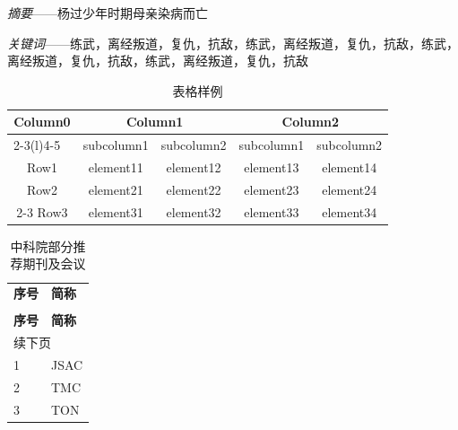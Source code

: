 

	\textit{摘要}——杨过少年时期母亲染病而亡

	\textit{关键词}——练武，离经叛道，复仇，抗敌，练武，离经叛道，复仇，抗敌，练武，离经叛道，复仇，抗敌，练武，离经叛道，复仇，抗敌


	\begin{table}[htbp]
		\captionsetup{list=no}%
		\caption{表格样例}
		\begin{tabular}{ccccc}
			\toprule
			\multirow{2}{*}{Column0} &  \multicolumn{2}{c}{Column1\tnote{1}} & \multicolumn{2}{c}{Column2\tnote{2}} \\
			\cmidrule(lr){2-3}\cmidrule(l){4-5}
			~     & subcolumn1 & subcolumn2 & subcolumn1 & subcolumn2 \\
			\midrule
			Row1  & element11 & element12 &element13 & element14 \\
			Row2  & element21 & element22 &element23 & element24 \\
			\cmidrule{2-3}\cmidrule{4-5}
			Row3  & element31 & element32 &element33 & element34 \\
			\bottomrule
		\end{tabular}
	\end{table}





	\begin{longtable}{p{2em} p{4.5em}}
		\captionsetup{list=no}%
		\caption{中科院部分推荐期刊及会议}\\
		
		\toprule
		\textbf{序号} & \textbf{简称} \\
		\midrule
		\endfirsthead
		
		\CPcaption{2}{中科院部分推荐期刊及会议}\\
		\toprule
		\textbf{序号} & \textbf{简称} \\
		\midrule
		\endhead
		
		\bottomrule
		\multicolumn{2}{l}{续下页} \\  %
		\endfoot
		
		\bottomrule
		\endlastfoot
		
		1 & JSAC \\
		2 & TMC \\
		3 & TON \\
	\end{longtable}
	
